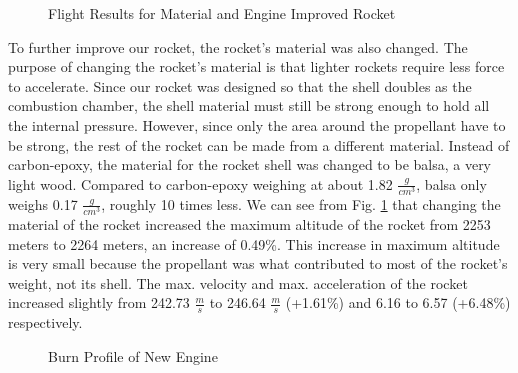 \documentclass{report}
\begin{document}
\begin{figure}[h!]
    \centering
    \caption{Flight Results for Material and Engine Improved Rocket}
    \label{fig:improv2}
\end{figure}

\noindent To further improve our rocket, the rocket's material was also changed.
The purpose of changing the rocket's material is that lighter rockets require less force to accelerate.
Since our rocket was designed so that the shell doubles as the combustion chamber, the shell material must still be strong enough to hold all the internal pressure.
However, since only the area around the propellant have to be strong, the rest of the rocket can be made from a different material.
Instead of carbon-epoxy, the material for the rocket shell was changed to be balsa, a very light wood.
Compared to carbon-epoxy weighing at about 1.82 $\frac{g}{cm^3}$, balsa only weighs 0.17 $\frac{g}{cm^3}$, roughly 10 times less. 
We can see from Fig. \ref{fig:improv2} that changing the material of the rocket increased the maximum altitude of the rocket from 2253 meters to 2264 meters, an increase of 0.49\%.
This increase in maximum altitude is very small because the propellant was what contributed to most of the rocket's weight, not its shell.
The max. velocity and max. acceleration of the rocket increased slightly from 242.73 $\frac{m}{s}$ to 246.64 $\frac{m}{s}$ (+1.61\%) and 6.16 to 6.57 (+6.48\%) respectively.


\begin{figure}[h!]
    \centering
    \caption{Burn Profile of New Engine}
    \label{fig:burnprof}
\end{figure}
\end{document}

